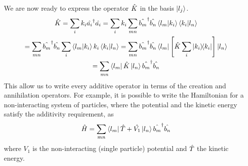 We are now ready to express the operator $\hat{K}$ in the basis $\ket{l_j}$.
\begin{multline}
    \hat{K} =  \sum_i k_i  \hat{a_i}^\dagger\hat{a_i}
    = \sum_i k_i \sum_{mn} \hat{b_m}^\dagger\hat{b_n} \braket{l_m}{k_i}\braket{k_i}{l_n}
    \\ = \sum_{mn} \hat{b_m}^\dagger\hat{b_n} \sum_i \braket{l_m}{k_i} k_i \braket{k_i}{l_n}
    = \sum_{mn} \hat{b_m}^\dagger\hat{b_n} \bra{l_m} \left[ \hat{K} \sum_i \op{k_i} \right] \ket{l_n}
    \\= \sum_{mn}  \bra{l_m}\hat{K}\ket{l_n} \hat{b_m}^\dagger\hat{b_n}
\end{multline}
This allow us to write every additive operator in terms of the creation and annihilation operators. For example, it is possible to write the Hamiltonian for a non-interacting system of particles, where the potential and the kinetic energy satisfy the additivity requirement, as
\begin{equation} \label{eq:second_quantization}
    \hat{H} = \sum_{mn} \bra{l_m}\hat{T}+\hat{V_1}\ket{l_n} \hat{b_m}^\dagger\hat{b_n}
\end{equation}
where $V_1$ is the non-interacting (single particle) potential and $\hat{T}$ the kinetic energy.